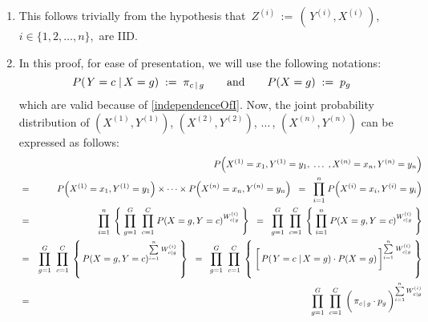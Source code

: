 \proof
\begin{enumerate}
\item
	This follows trivially from the hypothesis that
	\,$Z^{(i)} \,:=\, \left(\,Y^{(i)},X^{(i)}\,\right)$,\,
	$i \in \{1,2,\ldots,n\}$,\,
	are IID.
\item
	In this proof, for ease of presentation, we will use the following notations:
	\begin{equation*}
	P\!\left(\left.Y = c \;\right\vert X = g\right)
		\; := \;
		\pi_{c\,\vert\,g}
	\quad\quad
	\textnormal{and}
	\quad\quad
	P\!\left(X = g\right)
		\; := \;
		p_{g}
	\end{equation*}
	which are valid because of \eqref{independenceOfI}.
	Now, the joint probability distribution of
	$\left(X^{(1)},Y^{(1)}\right)$, $\left(X^{(2)},Y^{(2)}\right)$, $\ldots$\,, $\left(X^{(n)},Y^{(n)}\right)$
	can be expressed as follows:
	\begin{eqnarray*}
	&&
		P\!\left(X^{(1)} = x_{1},Y^{(1)}=y_{1}, \;\ldots\; ,X^{(n)} = x_{n},Y^{(n)}=y_{n}\right)
	\\
	&=&
		P\!\left(X^{(1)} = x_{1},Y^{(1)}=y_{1}\right) \times \cdots \times P\!\left(X^{(n)} = x_{n},Y^{(n)}=y_{n}\right)
	\;\;=\;\;
		\overset{n}{\underset{i=1}{\prod}} \; P\!\left(X^{(i)} = x_{i},Y^{(i)}=y_{i}\right)
	\\
	&=&
		\overset{n}{\underset{i=1}{\prod}} \;
		\left\{\;
			\overset{G}{\underset{g=1}{\prod}} \;\;
			\overset{C}{\underset{c=1}{\prod}} \;
			P\!\left(X = g,Y=c\right)^{W^{(i)}_{c \vert g}}
		\;\right\}
	\;\;=\;\;
		\overset{G}{\underset{g=1}{\prod}} \;\;
		\overset{C}{\underset{c=1}{\prod}} \;
		\left\{\;
			\overset{n}{\underset{i=1}{\prod}} \;
			P\!\left(X = g,Y=c\right)^{W^{(i)}_{c \vert g}}
		\;\right\}
	\\
	&=&
		\overset{G}{\underset{g=1}{\prod}} \;\;
		\overset{C}{\underset{c=1}{\prod}} \;
		\left\{\,
			P\!\left(X = g,Y=c\right)^{\overset{n}{\underset{i=1}{\sum}}\;W^{(i)}_{c \vert g}}
		\;\right\}
	\;\;=\;\;
		\overset{G}{\underset{g=1}{\prod}} \;\;
		\overset{C}{\underset{c=1}{\prod}} \;
		\left\{\;
			\left[\,P\!\left(\left.Y=c\;\right\vert X = g\right) \overset{{\color{white}\vert}}{\cdot} P\!\left(X=g\right)\,\right]
			^{\overset{n}{\underset{i=1}{\sum}}\;W^{(i)}_{c \vert g}}
		\;\right\}
	\\
	&=&
		\overset{G}{\underset{g=1}{\prod}} \;\;
		\overset{C}{\underset{c=1}{\prod}} \;
		\left(\,\pi_{c\,\vert\,g} \overset{{\color{white}\vert}}{\cdot} p_{g}\,\right)
		^{\overset{n}{\underset{i=1}{\sum}}\,W^{(i)}_{c \vert g}}
	\end{eqnarray*}

\end{enumerate}
